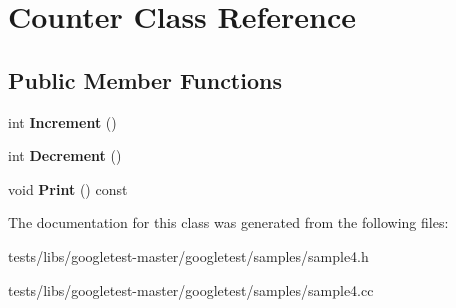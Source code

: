 \hypertarget{classCounter}{}\section{Counter Class Reference}
\label{classCounter}
\subsection*{Public Member Functions}
\begin{DoxyCompactItemize}
\item 
\mbox{\label{classCounter_a0a0ca9fdb580a2aec9a5a62ebed2b5ab}} 
int {\bfseries Increment} ()
\item 
\mbox{\label{classCounter_aa58d9b4f0bd96fc2331234493eb21bed}} 
int {\bfseries Decrement} ()
\item 
\mbox{\label{classCounter_a80092ec2a0deea0870b2e9f8ad0906bd}} 
void {\bfseries Print} () const
\end{DoxyCompactItemize}


The documentation for this class was generated from the following files\+:\begin{DoxyCompactItemize}
\item 
tests/libs/googletest-\/master/googletest/samples/sample4.\+h\item 
tests/libs/googletest-\/master/googletest/samples/sample4.\+cc\end{DoxyCompactItemize}
